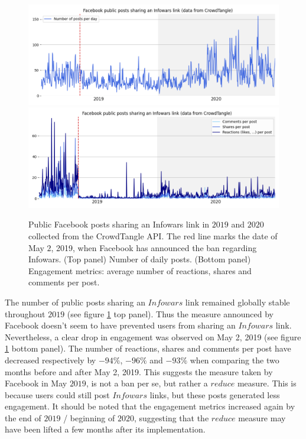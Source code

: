 \documentclass{article}
\begin{document}
\begin{figure}[h]
	\centering
	
		\includegraphics[scale=0.25]{../figure/facebook_crowdtangle_infowars_1.png}
		\includegraphics[scale=0.25]{../figure/facebook_crowdtangle_infowars_2.png} 
	
	\caption{Public Facebook posts sharing an Infowars link in $2019$ and $2020$ collected from the CrowdTangle API. The red line marks the date of May $2$, 2019, when Facebook has announced the ban regarding Infowars. (Top panel) Number of daily posts. (Bottom panel) Engagement metrics: average number of reactions, shares and comments per post. }
	\label{infowars1}
\end{figure}

The number of public posts sharing an $Infowars$ link remained globally stable throughout $2019$ (see figure \ref{infowars1} top panel). Thus the measure announced by Facebook doesn't seem to have prevented users from sharing an $Infowars$ link. Nevertheless, a clear drop in engagement was observed on May 2, 2019 (see figure \ref{infowars1} bottom panel). The number of reactions, shares and comments per post have decreased respectively  by $-94\%$,  $-96\%$ and $-93\%$  when comparing the two months before and after May 2, 2019. This suggests the measure taken by Facebook in May $2019$, is not a ban per se, but rather a $reduce$ measure. This is because users could still post $Infowars$ links, but these posts generated less engagement. It should be noted that the engagement metrics increased again by the end of $2019$ / beginning of $2020$, suggesting that the $reduce$ measure may have been lifted a few months after its implementation.
\end{document}
